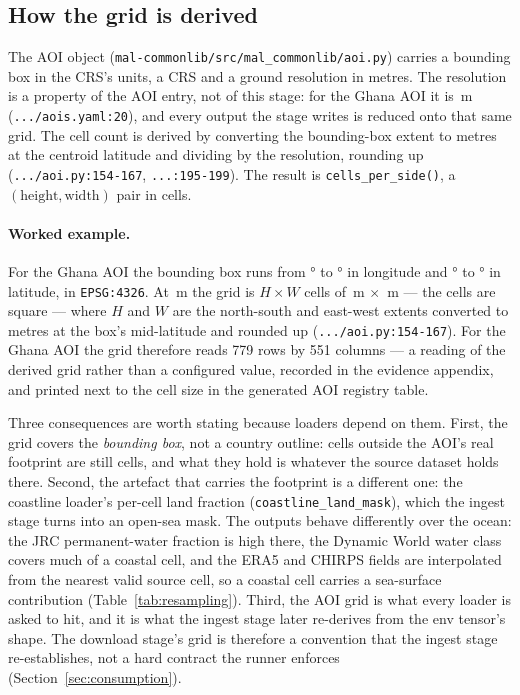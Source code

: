 \documentclass[11pt,a4paper]{article}
\newcommand{\code}[1]{\texttt{#1}}
\begin{document}
\subsection{How the grid is derived}
\label{sec:grid}

The AOI object (\code{mal-commonlib/src/mal\_commonlib/aoi.py}) carries a
bounding box in the CRS's units, a CRS and a ground resolution in metres. The
resolution is a property of the AOI entry, not of this stage: for the Ghana
AOI it is \,m
(\code{.../aois.yaml:20}), and every output the stage writes is reduced
onto that same grid. The cell count is derived by converting the
bounding-box extent to metres at the centroid latitude and dividing by the
resolution, rounding up
(\code{.../aoi.py:154-167},
\code{...:195-199}). The result is \code{cells\_per\_side()}, a
$(\text{height}, \text{width})$ pair in cells.

\paragraph{Worked example.} For the Ghana AOI the bounding box runs from
° to ° in longitude
and ° to ° in
latitude, in \code{EPSG:4326}. At \,m the grid
is $H\times W$ cells of \,m $\times$
\,m --- the cells are square --- where $H$ and
$W$ are the north-south and east-west extents converted to metres at the
box's mid-latitude and rounded up (\code{.../aoi.py:154-167}). For the Ghana
AOI the grid therefore reads 779 rows by 551 columns --- a reading of the
derived grid rather than a configured value, recorded in the evidence
appendix, and printed next to the cell size in the generated AOI registry
table.

Three consequences are worth stating because loaders depend on them. First,
the grid covers the \emph{bounding box}, not a country outline: cells outside
the AOI's real footprint are still cells, and what they hold is whatever the
source dataset holds there. Second, the artefact that carries the footprint
is a different one: the coastline loader's per-cell land fraction
(\code{coastline\_land\_mask}), which the ingest stage turns into an
open-sea mask. The outputs behave differently over the ocean: the JRC
permanent-water fraction is high there, the Dynamic World water class covers
much of a coastal cell, and the ERA5 and CHIRPS fields are interpolated
from the nearest valid source cell, so a coastal cell carries a
sea-surface contribution (Table~\ref{tab:resampling}). Third, the
AOI grid is what every
loader is asked to hit, and it is what the ingest stage later re-derives from
the env tensor's shape. The download stage's grid is therefore a convention
that the ingest stage re-establishes, not a hard contract the runner enforces
(Section~\ref{sec:consumption}).
\end{document}
